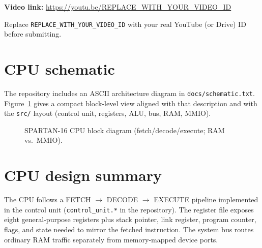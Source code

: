 \documentclass[12pt]{article}
\newcommand{\FibonacciVideoURL}{https://youtu.be/REPLACE\_WITH\_YOUR\_VIDEO\_ID}
\begin{document}
\noindent\textbf{Video link:} \url{\FibonacciVideoURL}

\noindent Replace \texttt{REPLACE\_WITH\_YOUR\_VIDEO\_ID} with your real YouTube (or Drive) ID before submitting.

\section{CPU schematic}
The repository includes an ASCII architecture diagram in \texttt{docs/schematic.txt}. Figure~\ref{fig:cpu} gives a compact block-level view aligned with that description and with the \texttt{src/} layout (control unit, registers, ALU, bus, RAM, MMIO).

\begin{figure}[ht]
  \centering
  \caption{SPARTAN-16 CPU block diagram (fetch/decode/execute; RAM vs.\ MMIO).}
  \label{fig:cpu}
\end{figure}

\section{CPU design summary}
The CPU follows a FETCH $\rightarrow$ DECODE $\rightarrow$ EXECUTE pipeline implemented in the control unit (\texttt{control\_unit.*} in the repository). The register file exposes eight general-purpose registers plus stack pointer, link register, program counter, flags, and state needed to mirror the fetched instruction. The system bus routes ordinary RAM traffic separately from memory-mapped device ports.
\end{document}
